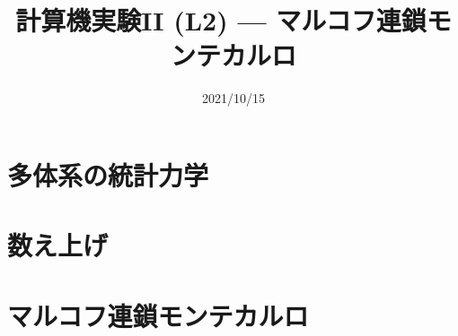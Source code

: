 \documentclass[10pt,dvipdfmx]{beamer}
\title{計算機実験II (L2) --- マルコフ連鎖モンテカルロ}
\date{2021/10/15}
\begin{document}
\begin{frame}
  \titlepage
  \tableofcontents
\end{frame}



\section{多体系の統計力学}






\section{数え上げ}




\section{マルコフ連鎖モンテカルロ}















\end{document}
